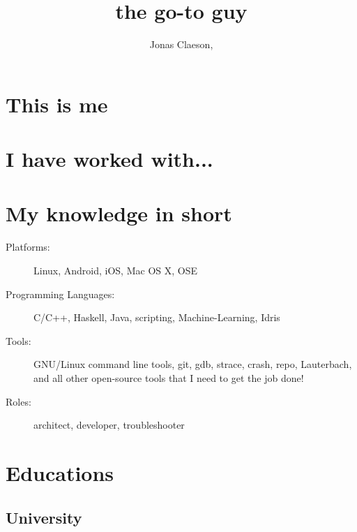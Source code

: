 \documentclass[ DIV=calc,%
                paper=a4,%
                fontsize=11pt,%
                twocolumn]{scrartcl}
\title{the go-to guy}
\author{Jonas Claeson, }
\date{}
\begin{document}
\maketitle
\thispagestyle{fancy}


\section*{This is me}


\vfill\null

\section*{I have worked with...}

\begin{description}











\end{description}

\section*{My knowledge in short}

\begin{description}
    \item[Platforms:] Linux, Android, iOS, Mac OS X, OSE
    \item[Programming Languages:] C/C++, Haskell, Java, scripting, Machine-Learning, Idris
    \item[Tools:] GNU/Linux command line tools, git, gdb, strace, crash, repo, Lauterbach, and all other open-source tools that I need to get the job done!
    \item[Roles:] architect, developer, troubleshooter
\end{description}

\section*{Educations}

\subsection*{University}
\end{document}
